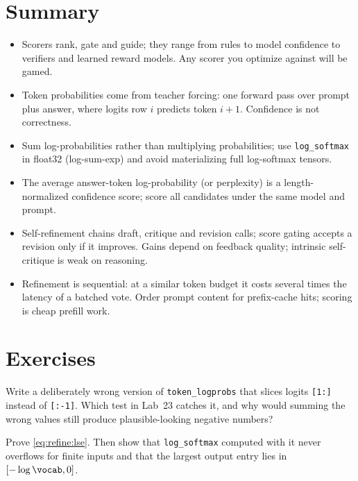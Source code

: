 \section{Summary}
\begin{itemize}
  \item Scorers rank, gate and guide; they range from rules to model confidence to verifiers and
  learned reward models. Any scorer you optimize against will be gamed.
  \item Token probabilities come from teacher forcing: one forward pass over prompt plus answer,
  where logits row $i$ predicts token $i{+}1$. Confidence is not correctness.
  \item Sum log-probabilities rather than multiplying probabilities; use \texttt{log\_softmax} in
  float32 (log-sum-exp) and avoid materializing full log-softmax tensors.
  \item The average answer-token log-probability (or perplexity) is a length-normalized confidence
  score; score all candidates under the same model and prompt.
  \item Self-refinement chains draft, critique and revision calls; score gating accepts a revision
  only if it improves. Gains depend on feedback quality; intrinsic self-critique is weak on reasoning.
  \item Refinement is sequential: at a similar token budget it costs several times the latency of a
  batched vote. Order prompt content for prefix-cache hits; scoring is cheap prefill work.
\end{itemize}

\section{Exercises}

\begin{exercise}
Write a deliberately wrong version of \texttt{token\_logprobs} that slices logits \texttt{[1:]}
instead of \texttt{[:-1]}. Which test in Lab~23 catches it, and why would summing the wrong values
still produce plausible-looking negative numbers?
\end{exercise}

\begin{exercise}
Prove \cref{eq:refine:lse}. Then show that \texttt{log\_softmax} computed with it never overflows for
finite inputs and that the largest output entry lies in $[-\log \vocab, 0]$.
\end{exercise}

